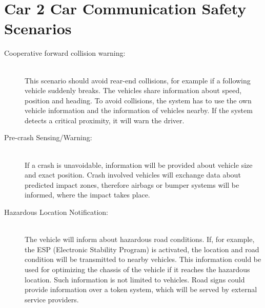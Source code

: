 \section{Car 2 Car Communication Safety Scenarios}
\label{sec:C2CSafetyScenarios}
\begin{description}
  \item[Cooperative forward collision warning:] \hfill \\ This scenario should avoid rear-end collisions, for example if a following vehicle suddenly breaks. The vehicles share information about speed, position and heading. To avoid collisions, the system has to use the own vehicle information and the information of vehicles nearby. If the system detects a critical proximity, it will warn the driver.
  \item[Pre-crash Sensing/Warning:] \hfill \\ If a crash is unavoidable, information will be provided about vehicle size and exact position. Crash involved vehicles will exchange data about predicted impact zones, therefore airbags or bumper systems will be informed, where the impact takes place. 
  \item[Hazardous Location Notification:] \hfill \\ The vehicle will inform about hazardous road conditions. If, for example, the ESP (Electronic Stability Program) is activated, the location and road condition will be transmitted to nearby vehicles. This information could be used for optimizing the chassis of the vehicle if it reaches the hazardous location. Such information is not limited to vehicles. Road signs could provide information over a token system, which will be served by external service providers. 
\end{description}	


